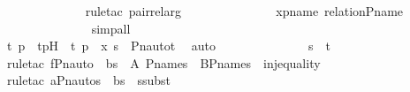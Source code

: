 \begin{isabellebody}
\ \ \ \ \ \ \ \ \ \ \ \ \isamarkupfalse%
\ {\isacharparenleft}{\kern0pt}rule{\isacharunderscore}{\kern0pt}tac\ pair{\isacharunderscore}{\kern0pt}rel{\isacharunderscore}{\kern0pt}arg{\isacharparenright}{\kern0pt}\ \isanewline
\ \ \ \ \ \ \ \ \ \ \ \ \isamarkupfalse%
\ xpname\ relation{\isacharunderscore}{\kern0pt}P{\isacharunderscore}{\kern0pt}name\ \isanewline
\ \ \ \ \ \ \ \ \ \ \ \ \ \isamarkupfalse%
\ simp{\isacharunderscore}{\kern0pt}all\ \isanewline
\ \ \ \ \ \ \ \ \ \ \ \ \isamarkupfalse%
\ \isanewline
\ \ \ \ \ \ \ \ \ \ \isamarkupfalse%
\ \isamarkupfalse%
\ t\ p\ \ tpH\ {\isacharcolon}{\kern0pt}\ {\isachardoublequoteopen}{\isacharless}{\kern0pt}t{\isacharcomma}{\kern0pt}\ p{\isachargreater}{\kern0pt}\ {\isasymin}\ x{\isachardoublequoteclose}\ {\isachardoublequoteopen}s{\isacharprime}{\kern0pt}\ {\isacharequal}{\kern0pt}\ Pn{\isacharunderscore}{\kern0pt}auto{\isacharparenleft}{\kern0pt}{\isasympi}{\isacharparenright}{\kern0pt}{\isacharbackquote}{\kern0pt}t{\isachardoublequoteclose}\ \isamarkupfalse%
\ auto\ \isanewline
\ \ \ \ \ \ \ \ \ \ \isamarkupfalse%
\ \isamarkupfalse%
\ {\isachardoublequoteopen}s\ {\isacharequal}{\kern0pt}\ t{\isachardoublequoteclose}\ \isanewline
\ \ \ \ \ \ \ \ \ \ \ \ \isamarkupfalse%
\ {\isacharparenleft}{\kern0pt}rule{\isacharunderscore}{\kern0pt}tac\ f{\isacharequal}{\kern0pt}{\isachardoublequoteopen}Pn{\isacharunderscore}{\kern0pt}auto{\isacharparenleft}{\kern0pt}{\isasympi}{\isacharparenright}{\kern0pt}{\isachardoublequoteclose}\ \ b{\isacharequal}{\kern0pt}{\isachardoublequoteopen}s{\isacharprime}{\kern0pt}{\isachardoublequoteclose}\ \ A{\isacharequal}{\kern0pt}\ P{\isacharunderscore}{\kern0pt}names\ \ B{\isacharequal}{\kern0pt}P{\isacharunderscore}{\kern0pt}names\ \ inj{\isacharunderscore}{\kern0pt}equality{\isacharparenright}{\kern0pt}\isanewline
\ \ \ \ \ \ \ \ \ \ \ \ \isamarkupfalse%
\ {\isacharparenleft}{\kern0pt}rule{\isacharunderscore}{\kern0pt}tac\ a{\isacharequal}{\kern0pt}{\isachardoublequoteopen}Pn{\isacharunderscore}{\kern0pt}auto{\isacharparenleft}{\kern0pt}{\isasympi}{\isacharparenright}{\kern0pt}{\isacharbackquote}{\kern0pt}s{\isachardoublequoteclose}\ \ b{\isacharequal}{\kern0pt}s{\isacharprime}{\kern0pt}\ \ ssubst{\isacharparenright}{\kern0pt}\ \isanewline
\ \ \ \ \ \ \ \ \ \ \ \ \isamarkupfalse%

\end{isabellebody}
